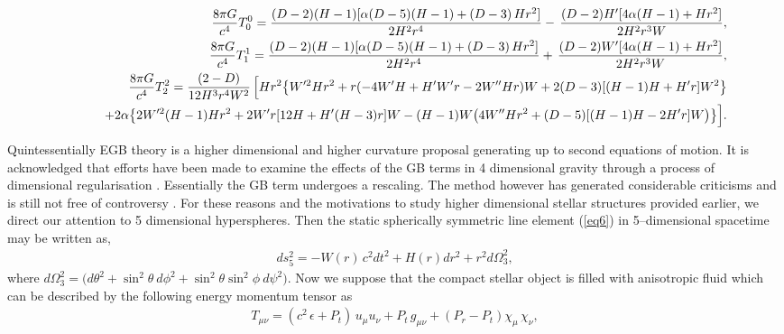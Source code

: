 \documentclass[]{aastex631}
\begin{document}
\begin{small}
\begin{eqnarray}
&&\hspace{-0.5cm} \frac{8\pi G }{c^4} T^0_0 = \frac{(D-2) (H-1) [\alpha (D-5) (H-1) + (D-3)\, H r^2]}{2 H^2 r^4} - \,\frac{(D-2) H^{\prime} [4 \alpha (H-1) + H r^2]}{2 H^2 r^3 W},  \label{eq7} \\
&& \hspace{-0.5cm} \frac{8\pi G }{c^4} T^1_1= \frac{(D-2) (H-1) [\alpha (D-5) (H-1) + (D-3)\, H r^2]}{2 H^2 r^4} + \,\frac{(D-2) W^{\prime} [4 \alpha (H-1) + H r^2]}{2 H^2 r^3 W},  \label{eq8}\\
&&\hspace{-0.5cm} \frac{8\pi G }{c^4} T^2_2 =\frac{(2-D)}{12 H^3 r^4 W^2}\, \Big[H r^2 \big\{W^{\prime 2} H r^2 + r (-4 W^{\prime} H + H^{\prime} W^{\prime} r  - 2 W^{\prime \prime} H r) W + 
    2 (D-3) [(H-1) H + H^{\prime} r] W^2\big\} \nonumber\\
&& \hspace{0.8cm} + 
 2 \alpha \big\{2 W^{\prime 2} (H-1) H r^2 + 
    2 W^{\prime} r [12 H + H^{\prime} (H-3) r] W  - (H-1) W \big(4 W^{\prime \prime} H r^2 + (D-5) [(H-1) H  - 2 H^{\prime} r] W\big) \big\} \Big].  \label{eq9}
\end{eqnarray}
\end{small}
 Quintessentially EGB theory is a higher dimensional and higher curvature proposal generating up to second equations of motion. It is acknowledged that efforts have been made to examine the effects of the GB terms in 4 dimensional gravity through a process of  dimensional regularisation \citep{glavan,tomozawa}. Essentially the GB term undergoes a rescaling. The method however has generated considerable criticisms and is still not free of controversy \citep{gurses1,gurses2}. For these reasons and the motivations to study higher dimensional stellar structures provided earlier, we direct our attention to 5 dimensional hyperspheres. Then the static  spherically symmetric line element (\ref{eq6}) in 5--dimensional spacetime may be written as, 
\begin{eqnarray}\label{eq10}
ds^2_{5}= - W(r) \, c^2dt^2 + H (r) dr^2 + r^{2} d\Omega^2_3, 
\end{eqnarray} 
where $d\Omega^2_3=\big(d \theta^2+\sin^2 \theta~ d\phi^2 +\sin^2 \theta \sin^2 \phi ~d\psi^2 \big)$.  Now we suppose that the compact stellar object is filled with anisotropic fluid which can be described by the following energy momentum tensor as
\begin{eqnarray}
T_{\mu\nu} = (c^2\,\epsilon + P_{t})\,u_{\mu} u_{\nu}+ P_{t}\, g_{\mu\nu}+(P_r-P_{t})\chi_{\mu}\,\chi_{\nu}, \label{eq11}
\end{eqnarray}
\end{document}
